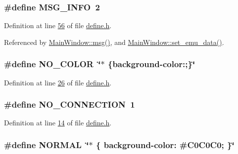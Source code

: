 \hypertarget{a00090_a1ddcc97224a95cec04b38b0ac866fa19}{
\subsubsection[{M\+S\+G\+\_\+\+I\+N\+F\+O}]{\setlength{\rightskip}{0pt plus 5cm}\#define M\+S\+G\+\_\+\+I\+N\+F\+O~2}}\label{a00090_a1ddcc97224a95cec04b38b0ac866fa19}


Definition at line \hyperlink{a00090_source_l00056}{56} of file \hyperlink{a00090_source}{define.\+h}.



Referenced by \hyperlink{a00109_source_l00145}{Main\+Window\+::msg()}, and \hyperlink{a00134_source_l00606}{Main\+Window\+::set\+\_\+emu\+\_\+data()}.

\hypertarget{a00090_a69d859e537f858ca285d77a66755ded6}{
\subsubsection[{N\+O\+\_\+\+C\+O\+L\+O\+R}]{\setlength{\rightskip}{0pt plus 5cm}\#define N\+O\+\_\+\+C\+O\+L\+O\+R~\char`\"{}$\ast$ \{background-\/color\+:;\}\char`\"{}}}\label{a00090_a69d859e537f858ca285d77a66755ded6}


Definition at line \hyperlink{a00090_source_l00026}{26} of file \hyperlink{a00090_source}{define.\+h}.

\hypertarget{a00090_ae85d2d9036fe89b7201a98b2b3a091d2}{
\subsubsection[{N\+O\+\_\+\+C\+O\+N\+N\+E\+C\+T\+I\+O\+N}]{\setlength{\rightskip}{0pt plus 5cm}\#define N\+O\+\_\+\+C\+O\+N\+N\+E\+C\+T\+I\+O\+N~1}}\label{a00090_ae85d2d9036fe89b7201a98b2b3a091d2}


Definition at line \hyperlink{a00090_source_l00014}{14} of file \hyperlink{a00090_source}{define.\+h}.

\hypertarget{a00090_a1291f416b069313021b519eea62d5bf1}{
\subsubsection[{N\+O\+R\+M\+A\+L}]{\setlength{\rightskip}{0pt plus 5cm}\#define N\+O\+R\+M\+A\+L~\char`\"{}$\ast$ \{ background-\/color\+: \#C0\+C0\+C0; \}\char`\"{}}}\label{a00090_a1291f416b069313021b519eea62d5bf1}


